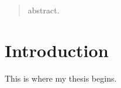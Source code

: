 \documentclass[a4paper,10pt]{memoir}
\begin{document}
\frontmatter

\maketitle
\cleardoublepage

\begin{abstract}
	\thispagestyle{plain}
	abstract.
\end{abstract}
\cleardoublepage

\tableofcontents
\cleardoublepage

\mainmatter

\chapter{Introduction}

This is where my thesis begins.
\end{document}
